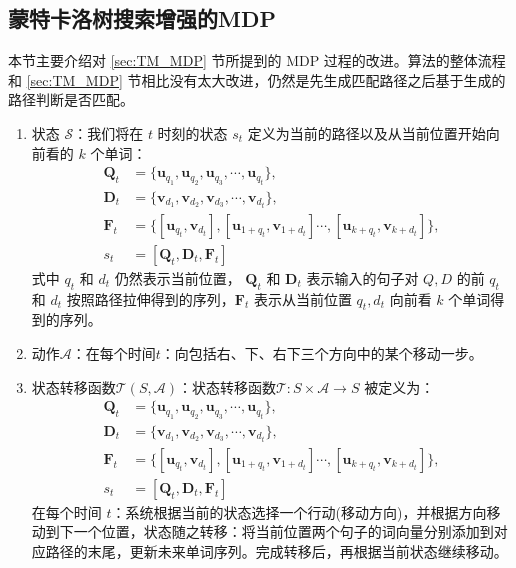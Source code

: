 \subsection{蒙特卡洛树搜索增强的MDP}
本节主要介绍对 \ref{sec:TM_MDP} 节所提到的 MDP 过程的改进。算法的整体流程和 \ref{sec:TM_MDP} 节相比没有太大改进，仍然是先生成匹配路径之后基于生成的路径判断是否匹配。
\begin{enumerate}
	\item 状态 $\mathcal{S}$：我们将在 $t$ 时刻的状态 $s_t$ 定义为当前的路径以及从当前位置开始向前看的 $k$ 个单词：
\begin{equation}
\label{eq:MCTS_state}
\begin{aligned}
\mathbf{Q}_t &= \{\mathbf{u}_{q_1}, \mathbf{u}_{q_2}, \mathbf{u}_{q_3}, \cdots, \mathbf{u}_{q_t}\},\\
\mathbf{D}_t &= \{\mathbf{v}_{d_1}, \mathbf{v}_{d_2}, \mathbf{v}_{d_3},\cdots, \mathbf{v}_{d_t}\},\\
\mathbf{F}_t &= \{[\mathbf{u}_{q_t}, \mathbf{v}_{d_t}], [\mathbf{u}_{1+q_t},\mathbf{v}_{1+d_t}] \cdots, [\mathbf{u}_{k+q_t}, \mathbf{v}_{k+d_t}]\},\\
s_t &= [\mathbf{Q}_t, \mathbf{D}_t, \mathbf{F}_t]
\end{aligned}
\end{equation}
式中 $q_t$ 和 $d_t$ 仍然表示当前位置， $\mathbf{Q}_t$ 和 $\mathbf{D}_t$ 表示输入的句子对 $Q, D$ 的前 $q_t$ 和 $d_t$ 按照路径拉伸得到的序列，$\mathbf{F}_t$ 表示从当前位置 $q_t, d_t$ 向前看 $k$ 个单词得到的序列。

	\item 动作$\mathcal{A}$：在每个时间$t$：向包括右、下、右下三个方向中的某个移动一步。
	
	\item 状态转移函数$\mathcal{T}(S,\mathcal{A})$：状态转移函数$\mathcal{T}:S\times \mathcal{A}\rightarrow S$ 被定义为：
\begin{equation}
\label{eq:MCTS_translation}
\begin{aligned}
\mathbf{Q}_t &= \{\mathbf{u}_{q_1}, \mathbf{u}_{q_2}, \mathbf{u}_{q_3}, \cdots, \mathbf{u}_{q_t}\},\\
\mathbf{D}_t &= \{\mathbf{v}_{d_1}, \mathbf{v}_{d_2}, \mathbf{v}_{d_3},\cdots, \mathbf{v}_{d_t}\},\\
\mathbf{F}_t &= \{[\mathbf{u}_{q_t}, \mathbf{v}_{d_t}], [\mathbf{u}_{1+q_t},\mathbf{v}_{1+d_t}] \cdots, [\mathbf{u}_{k+q_t}, \mathbf{v}_{k+d_t}]\},\\
s_t &= [\mathbf{Q}_t, \mathbf{D}_t, \mathbf{F}_t]
\end{aligned}
\end{equation}
在每个时间 $t$：系统根据当前的状态选择一个行动(移动方向)，并根据方向移动到下一个位置，状态随之转移：将当前位置两个句子的词向量分别添加到对应路径的末尾，更新未来单词序列。完成转移后，再根据当前状态继续移动。


\end{enumerate}
